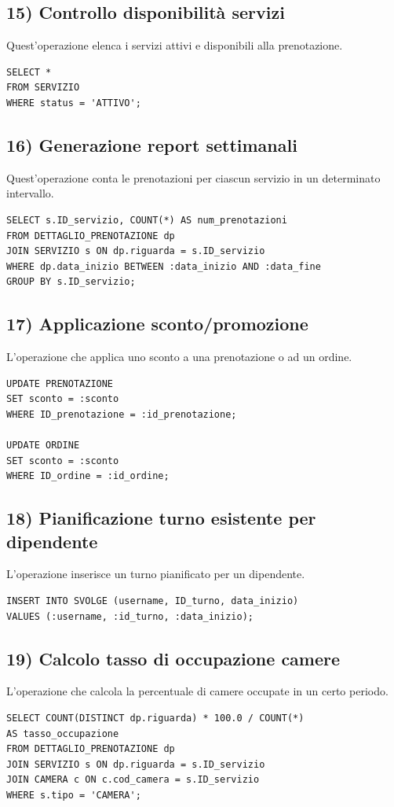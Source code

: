 \documentclass[a4paper,12pt]{report}
\begin{document}
\subsection*{15) Controllo disponibilità servizi}
Quest'operazione elenca i servizi attivi e disponibili alla prenotazione.
\begin{verbatim}
SELECT *
FROM SERVIZIO
WHERE status = 'ATTIVO';
\end{verbatim}

\subsection*{16) Generazione report settimanali}
Quest'operazione conta le prenotazioni per ciascun servizio in un determinato intervallo.
\begin{verbatim}
SELECT s.ID_servizio, COUNT(*) AS num_prenotazioni
FROM DETTAGLIO_PRENOTAZIONE dp
JOIN SERVIZIO s ON dp.riguarda = s.ID_servizio
WHERE dp.data_inizio BETWEEN :data_inizio AND :data_fine
GROUP BY s.ID_servizio;
\end{verbatim}

\subsection*{17) Applicazione sconto/promozione}
L'operazione che applica uno sconto a una prenotazione o ad un ordine.
\begin{verbatim}
UPDATE PRENOTAZIONE
SET sconto = :sconto
WHERE ID_prenotazione = :id_prenotazione;

UPDATE ORDINE
SET sconto = :sconto
WHERE ID_ordine = :id_ordine;
\end{verbatim}

\subsection*{18) Pianificazione turno esistente per dipendente}
L'operazione inserisce un turno pianificato per un dipendente.
\begin{verbatim}
INSERT INTO SVOLGE (username, ID_turno, data_inizio)
VALUES (:username, :id_turno, :data_inizio);
\end{verbatim}

\subsection*{19) Calcolo tasso di occupazione camere}
L'operazione che calcola la percentuale di camere occupate in un certo periodo.
\begin{verbatim}
SELECT COUNT(DISTINCT dp.riguarda) * 100.0 / COUNT(*) 
AS tasso_occupazione
FROM DETTAGLIO_PRENOTAZIONE dp
JOIN SERVIZIO s ON dp.riguarda = s.ID_servizio
JOIN CAMERA c ON c.cod_camera = s.ID_servizio
WHERE s.tipo = 'CAMERA';
\end{verbatim}
\end{document}
